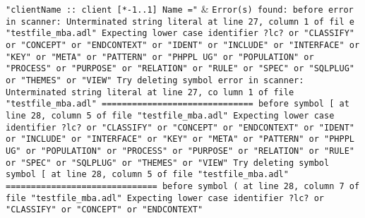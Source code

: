\texttt{"clientName :: client [*-1..1] Name ="} & \texttt{Error(s) found:\newline
  \newline
  before error in scanner: Unterminated string literal at line 27, column 1 of fil\newline
  e "testfile\_mba.adl"\newline
  Expecting lower case identifier ?lc? or "CLASSIFY" or "CONCEPT" or "ENDCONTEXT"\newline
  or "IDENT" or "INCLUDE" or "INTERFACE" or "KEY" or "META" or "PATTERN" or "PHPPL\newline
  UG" or "POPULATION" or "PROCESS" or "PURPOSE" or "RELATION" or "RULE" or "SPEC"\newline
  or "SQLPLUG" or "THEMES" or "VIEW"\newline
  Try deleting symbol error in scanner: Unterminated string literal at line 27, co\newline
  lumn 1 of file "testfile\_mba.adl"\newline
  \newline
  ==============================\newline
  \newline
  before symbol [ at line 28, column 5 of file "testfile\_mba.adl"\newline
  Expecting lower case identifier ?lc? or "CLASSIFY" or "CONCEPT" or "ENDCONTEXT"\newline
  or "IDENT" or "INCLUDE" or "INTERFACE" or "KEY" or "META" or "PATTERN" or "PHPPL\newline
  UG" or "POPULATION" or "PROCESS" or "PURPOSE" or "RELATION" or "RULE" or "SPEC"\newline
  or "SQLPLUG" or "THEMES" or "VIEW"\newline
  Try deleting symbol symbol [ at line 28, column 5 of file "testfile\_mba.adl"\newline
  \newline
  ==============================\newline
  \newline
  before symbol ( at line 28, column 7 of file "testfile\_mba.adl"\newline
  Expecting lower case identifier ?lc? or "CLASSIFY" or "CONCEPT" or "ENDCONTEXT"\newline
}
